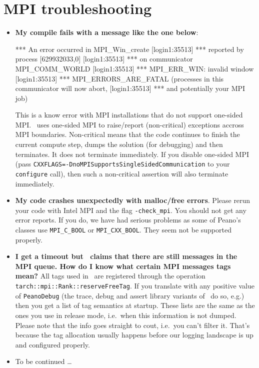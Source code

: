 \section{MPI troubleshooting}
\begin{itemize}
  \item \textbf{My compile fails with a message like the one below}:
  \begin{code}
[login1:35513] *** An error occurred in MPI_Win_create
[login1:35513] *** reported by process [629932033,0]
[login1:35513] *** on communicator MPI_COMM_WORLD
[login1:35513] *** MPI_ERR_WIN: invalid window
[login1:35513] *** MPI_ERRORS_ARE_FATAL (processes in this communicator will now abort,
[login1:35513] ***    and potentially your MPI job)  
  \end{code}
  This is a know error with MPI installations that do not support one-sided MPI. 
  \Peano\ uses one-sided MPI to raise/report (non-critical) exceptions accross MPI boundaries.
  Non-critical means that the code continues to finish the current compute step,
  dumps the solution (for debugging) and then terminates. It does not terminate
		immediately. If you disable one-sided MPI (pass \linebreak \texttt{CXXFLAGS=-DnoMPISupportsSingleSidedCommunication} to your \texttt{configure} call), then such a non-critical assertion
  will also terminate immediately.
  \item \textbf{My code crashes unexpectedly with malloc/free errors}. Please
  rerun your code with Intel MPI and the flag \texttt{-check\_mpi}. You should
  not get any error reports. If you do, we have had serious problems as some of
  Peano's classes use \texttt{MPI\_C\_BOOL} or \texttt{MPI\_CXX\_BOOL}. They
  seem not be supported properly.
  \item \textbf{I get a timeout but \Peano\ claims that there are still
  messages in the MPI queue. How do I know what certain MPI messages tags
  mean?} All tags used in \Peano\ are registered through the operation \linebreak 
  \texttt{tarch::mpi::Rank::reserveFreeTag}. If you translate with any positive
  value of \texttt{PeanoDebug} (the trace, debug and assert library variants of
  \Peano\ do so, e.g.) then you get a list of tag semantics at startup. These
  lists are the same as the ones you use in release mode, i.e.~when this
  information is not dumped. Please note that the info goes straight to cout,
  i.e.~you can't filter it. That's because the tag allocation usually happens
  before our logging landscape is up and configured properly.
  \item To be continued \dots
\end{itemize}



